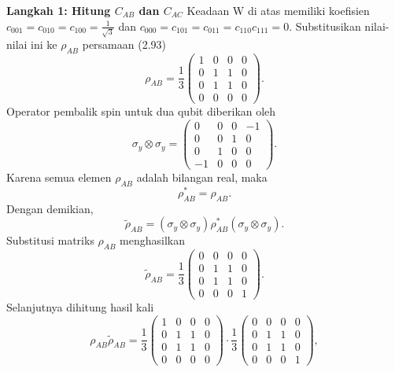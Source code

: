 \par
\textbf{Langkah 1: Hitung $C_{AB}$ dan $C_{AC}$}
Keadaan W di atas memiliki koefisien $c_{001}=c_{010}=c_{100}=\frac{1}{\sqrt{3}}$ dan $c_{000}=c_{101}=c_{011}=c_{110}c_{111}=0$. Substitusikan nilai-nilai ini ke $\rho_{AB}$ persamaan (2.93)
\begin{equation}
	\rho_{AB}
	=
	\frac{1}{3}
	\begin{pmatrix}
		1&0&0&0\\
		0&1&1&0\\
		0&1&1&0\\
		0&0&0&0
	\end{pmatrix}.
\end{equation}
Operator pembalik spin untuk dua qubit diberikan oleh
\begin{equation}
	\sigma_y \otimes \sigma_y=
	\begin{pmatrix}
		0&0&0&-1\\
		0&0&1&0\\
		0&1&0&0\\
		-1&0&0&0
	\end{pmatrix}.
\end{equation}
Karena semua elemen $\rho_{AB}$ adalah bilangan real, maka
\begin{equation}
	\rho_{AB}^{*}=\rho_{AB}.
\end{equation}
Dengan demikian,
\begin{equation}
	\tilde{\rho}_{AB}
	=
	(\sigma_y\otimes\sigma_y)
	\rho_{AB}^{*}
	(\sigma_y\otimes\sigma_y).
\end{equation}
Substitusi matriks $\rho_{AB}$ menghasilkan
\begin{equation}
	\tilde{\rho}_{AB}
	=
	\frac{1}{3}
	\begin{pmatrix}
		0&0&0&0\\
		0&1&1&0\\
		0&1&1&0\\
		0&0&0&1
	\end{pmatrix}.
\end{equation}
Selanjutnya dihitung hasil kali
\begin{equation}
	\rho_{AB}\tilde{\rho}_{AB}
	=
	\frac{1}{3}
	\begin{pmatrix}
		1&0&0&0\\
		0&1&1&0\\
		0&1&1&0\\
		0&0&0&0
	\end{pmatrix}
	\cdot
	\frac{1}{3}
	\begin{pmatrix}
		0&0&0&0\\
		0&1&1&0\\
		0&1&1&0\\
		0&0&0&1
	\end{pmatrix},
\end{equation}
